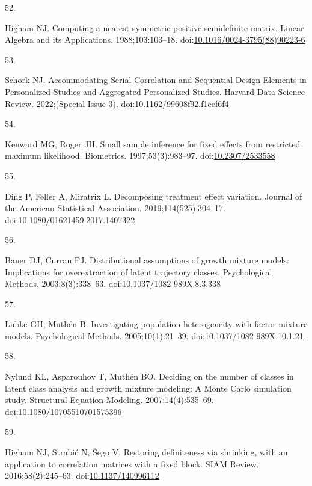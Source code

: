 \documentclass[
  11pt,
]{article}
\newlength{\cslhangindent}
\newlength{\csllabelwidth}
\newenvironment{CSLReferences}[2] %
 {\begin{list}{}{%
  \setlength{\itemindent}{0pt}
  \setlength{\leftmargin}{0pt}
  \setlength{\parsep}{0pt}
  \ifodd #1
   \setlength{\leftmargin}{\cslhangindent}
   \setlength{\itemindent}{-1\cslhangindent}
  \fi
  \setlength{\itemsep}{#2\baselineskip}}}
 {\end{list}}
\newcommand{\CSLLeftMargin}[1]{\parbox[t]{\csllabelwidth}{\strut#1\strut}}
\newcommand{\CSLRightInline}[1]{\parbox[t]{\linewidth - \csllabelwidth}{\strut#1\strut}}
\begin{document}
\begin{CSLReferences}{0}{1}
\CSLLeftMargin{52. }%
\CSLRightInline{Higham NJ. Computing a nearest symmetric positive semidefinite matrix. Linear Algebra and its Applications. 1988;103:103--18. doi:\href{https://doi.org/10.1016/0024-3795(88)90223-6}{10.1016/0024-3795(88)90223-6}}

\CSLLeftMargin{53. }%
\CSLRightInline{Schork NJ. {Accommodating Serial Correlation and Sequential Design Elements in Personalized Studies and Aggregated Personalized Studies}. Harvard Data Science Review. 2022;(Special Issue 3). doi:\href{https://doi.org/10.1162/99608f92.f1eef6f4}{10.1162/99608f92.f1eef6f4}}

\CSLLeftMargin{54. }%
\CSLRightInline{Kenward MG, Roger JH. Small sample inference for fixed effects from restricted maximum likelihood. Biometrics. 1997;53(3):983--97. doi:\href{https://doi.org/10.2307/2533558}{10.2307/2533558}}

\CSLLeftMargin{55. }%
\CSLRightInline{Ding P, Feller A, Miratrix L. Decomposing treatment effect variation. Journal of the American Statistical Association. 2019;114(525):304--17. doi:\href{https://doi.org/10.1080/01621459.2017.1407322}{10.1080/01621459.2017.1407322}}

\CSLLeftMargin{56. }%
\CSLRightInline{Bauer DJ, Curran PJ. Distributional assumptions of growth mixture models: Implications for overextraction of latent trajectory classes. Psychological Methods. 2003;8(3):338--63. doi:\href{https://doi.org/10.1037/1082-989X.8.3.338}{10.1037/1082-989X.8.3.338}}

\CSLLeftMargin{57. }%
\CSLRightInline{Lubke GH, Muthén B. Investigating population heterogeneity with factor mixture models. Psychological Methods. 2005;10(1):21--39. doi:\href{https://doi.org/10.1037/1082-989X.10.1.21}{10.1037/1082-989X.10.1.21}}

\CSLLeftMargin{58. }%
\CSLRightInline{Nylund KL, Asparouhov T, Muthén BO. Deciding on the number of classes in latent class analysis and growth mixture modeling: A {M}onte {C}arlo simulation study. Structural Equation Modeling. 2007;14(4):535--69. doi:\href{https://doi.org/10.1080/10705510701575396}{10.1080/10705510701575396}}

\CSLLeftMargin{59. }%
\CSLRightInline{Higham NJ, Strabić N, Šego V. Restoring definiteness via shrinking, with an application to correlation matrices with a fixed block. SIAM Review. 2016;58(2):245--63. doi:\href{https://doi.org/10.1137/140996112}{10.1137/140996112}}

\end{CSLReferences}
\end{document}
